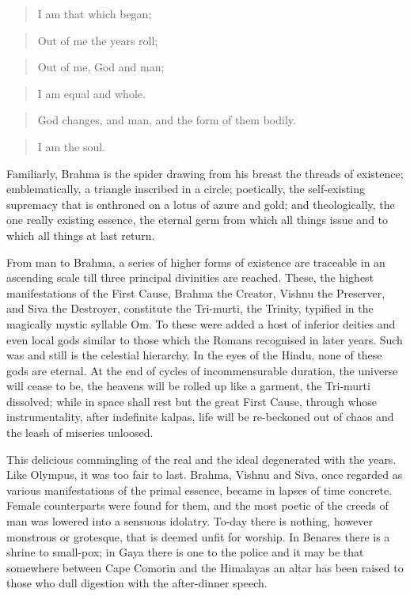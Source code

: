 \documentclass[]{book}
\begin{document}
\begin{quote}
I am that which began;
\end{quote}

\begin{quote}
Out of me the years roll;
\end{quote}

\begin{quote}
Out of me, God and man;
\end{quote}

\begin{quote}
I am equal and whole.
\end{quote}

\begin{quote}
God changes, and man, and the form of them bodily.
\end{quote}

\begin{quote}
I am the soul.
\end{quote}

Familiarly, Brahma is the spider drawing from his breast the threads of
existence; emblematically, a triangle inscribed in a circle; poetically,
the self-existing supremacy that is enthroned on a lotus of azure and
gold; and theologically, the one really existing essence, the eternal
germ from which all things issue and to which all things at last return.

From man to Brahma, a series of higher forms of existence are traceable
in an ascending scale till three principal divinities are reached.
These, the highest manifestations of the First Cause, Brahma the
Creator, Vishnu the Preserver, and Siva the Destroyer, constitute the
Tri-murti, the Trinity, typified in the magically mystic syllable Om. To
these were added a host of inferior deities and even local gods similar
to those which the Romans recognised in later years. Such was and still
is the celestial hierarchy. In the eyes of the Hindu, none of these gods
are eternal. At the end of cycles of incommensurable duration, the
universe will cease to be, the heavens will be rolled up like a garment,
the Tri-murti dissolved; while in space shall rest but the great First
Cause, through whose instrumentality, after indefinite kalpas, life will
be re-beckoned out of chaos and the leash of miseries unloosed.

This delicious commingling of the real and the ideal degenerated with
the years. Like Olympus, it was too fair to last. Brahma, Vishnu and
Siva, once regarded as various manifestations of the primal essence,
became in lapses of time concrete. Female counterparts were found for
them, and the most poetic of the creeds of man was lowered into a
sensuous idolatry. To-day there is nothing, however monstrous or
grotesque, that is deemed unfit for worship. In Benares there is a
shrine to small-pox; in Gaya there is one to the police and it may be
that somewhere between Cape Comorin and the Himalayas an altar has been
raised to those who dull digestion with the after-dinner speech.
\end{document}
